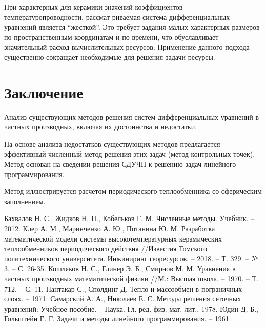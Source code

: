 \documentclass[a4paper,11pt,numreferences,mathsec,kaplist]{isuepsutf8}
\begin{document}
\begin{article}
При характерных для керамики значений коэффициентов
температуропроводности, рассмат риваемая система дифференциальных
уравнений является “жесткой”. Это требует задания малых характерных
размеров по пространственным координатам и по времени, что
обуславливает значительный расход вычислительных ресурсов. Применение
данного подхода существенно сокращает необходимые для решения задачи
ресурсы. 

\section{Заключение}

Анализ существующих методов решения систем дифференциальных уравнений
в частных производных, включая их достоинства и недостатки.

На основе анализа недостатков существующих методов предлагается
эффективный численный метод решения этих задач (метод контрольных
точек). Метод основан на сведении решения СДУЧП к решению задач
линейного программирования.

Метод иллюстрируется расчетом периодического теплообменника со
сферическим заполнением.

\begin{thebibliography}{999}
 Бахвалов Н. С., Жидков Н. П., Кобельков Г. М.
    Численные методы. Учебник. – 2012.
 Клер А. М., Маринченко А. Ю., Потанина Ю. М.
    Разработка математической модели системы высокотемпературных
    керамических теплообменников периодического действия
    //Известия Томского политехнического университета. Инжиниринг
    георесурсов. – 2018. – Т. 329. – №. 3. – С. 26-35.
 Кошляков Н. С., Глинер Э. Б., Смирнов М. М.
    Уравнения в частных производных математической физики //М.:
    Высшая школа. – 1970. – Т. 712. – С. 11.
 Пантакар С., Сполдинг Д. Тепло и массообмен в
    пограничных слоях. – 1971.
 Самарский А. А., Николаев Е. С. Методы решения
    сеточных уравнений: Учебное пособие. – Наука. Гл. ред. физ.-мат.
        лит., 1978.
 Юдин Д. Б., Гольштейн Е. Г. Задачи и методы линейного
    программирования. – 1961.


\end{thebibliography}
\end{article}
\end{document}

